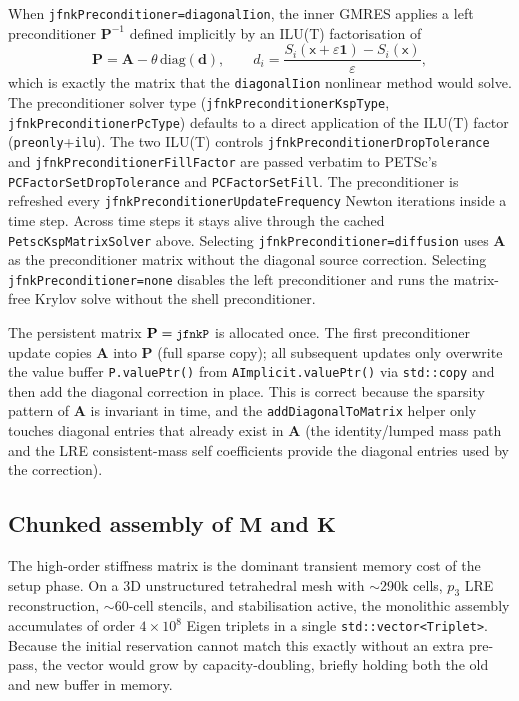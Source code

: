 \documentclass[11pt,a4paper]{article}
\newcommand{\code}[1]{\texttt{\small #1}}
\newcommand{\Mmass}{\mathbf{M}}
\newcommand{\Kstif}{\mathbf{K}}
\newcommand{\Aimp}{\mathbf{A}}
\begin{document}
When \code{jfnkPreconditioner=diagonalIion}, the inner GMRES applies a
left preconditioner $\mathbf{P}^{-1}$ defined implicitly by an ILU(T)
factorisation of
\begin{equation}
  \mathbf{P}
  =
  \Aimp - \theta\,\mathrm{diag}(\mathbf{d}),
  \qquad
  d_i =
  \frac{S_i(\mathsf{x}+\varepsilon\mathbf{1})-S_i(\mathsf{x})}{\varepsilon},
  \label{eq:jfnk-pc-matrix}
\end{equation}
which is exactly the matrix that the \code{diagonalIion} nonlinear method
would solve. The preconditioner solver type (\code{jfnkPreconditionerKspType},
\code{jfnkPreconditionerPcType}) defaults to a direct application of the
ILU(T) factor (\code{preonly}+\code{ilu}). The two ILU(T) controls
\code{jfnkPreconditionerDropTolerance} and
\code{jfnkPreconditionerFillFactor} are passed verbatim to PETSc's
\code{PCFactorSetDropTolerance} and \code{PCFactorSetFill}. The preconditioner
is refreshed every \code{jfnkPreconditionerUpdateFrequency} Newton iterations
inside a time step. Across time steps it stays alive through the cached
\code{PetscKspMatrixSolver} above. Selecting
\code{jfnkPreconditioner=diffusion} uses $\Aimp$ as the preconditioner matrix
without the diagonal source correction. Selecting
\code{jfnkPreconditioner=none} disables the left preconditioner and runs the
matrix-free Krylov solve without the shell preconditioner.

The persistent matrix $\mathbf{P}=\code{jfnkP}$ is allocated once. The first
preconditioner update copies $\Aimp$ into $\mathbf{P}$ (full sparse copy); all
subsequent updates only overwrite the value buffer
\code{P.valuePtr()} from \code{AImplicit.valuePtr()} via \code{std::copy} and
then add the diagonal correction in place. This is correct because the
sparsity pattern of $\Aimp$ is invariant in time, and the
\code{addDiagonalToMatrix} helper only touches diagonal entries that already
exist in $\Aimp$ (the identity/lumped mass path and the LRE consistent-mass
self coefficients provide the diagonal entries used by the correction).

\subsection{Chunked assembly of \texorpdfstring{$\Mmass$}{M} and
\texorpdfstring{$\Kstif$}{K}}
\label{sec:chunked-assembly}

The high-order stiffness matrix is the dominant transient memory cost of the
setup phase. On a 3D unstructured tetrahedral mesh with $\sim$290k cells, $p_3$
LRE reconstruction, $\sim$60-cell stencils, and stabilisation active, the
monolithic assembly accumulates of order $4\times 10^8$ Eigen triplets in a
single \code{std::vector<Triplet>}. Because the initial reservation cannot
match this exactly without an extra pre-pass, the vector would grow by
capacity-doubling, briefly holding both the old and new buffer in memory.
\end{document}
